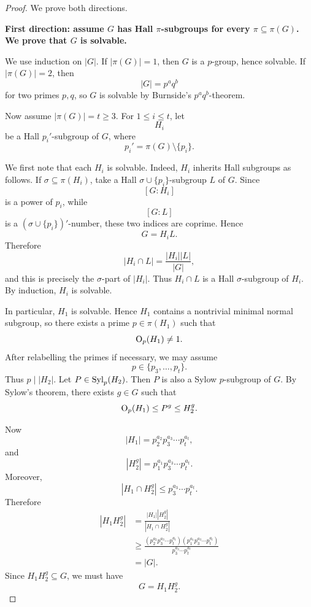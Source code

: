 \begin{proof}
We prove both directions.

\medskip

\noindent
\textbf{First direction: assume \(G\) has Hall \(\pi\)-subgroups for every
\(\pi\subseteq \pi(G)\). We prove that \(G\) is solvable.}

We use induction on \(|G|\). If \(|\pi(G)|=1\), then \(G\) is a \(p\)-group, hence
solvable. If \(|\pi(G)|=2\), then
\[
    |G|=p^a q^b
\]
for two primes \(p,q\), so \(G\) is solvable by Burnside's \(p^a q^b\)-theorem.

Now assume \(|\pi(G)|=t\geq 3\). For \(1\leq i\leq t\), let
\[
    H_i
\]
be a Hall \(p_i'\)-subgroup of \(G\), where
\[
    p_i'=\pi(G)\setminus \{p_i\}.
\]

We first note that each \(H_i\) is solvable. Indeed, \(H_i\) inherits Hall
subgroups as follows. If \(\sigma\subseteq \pi(H_i)\), take a Hall
\(\sigma\cup\{p_i\}\)-subgroup \(L\) of \(G\). Since
\[
    [G:H_i]
\]
is a power of \(p_i\), while
\[
    [G:L]
\]
is a \((\sigma\cup\{p_i\})'\)-number, these two indices are coprime. Hence
\[
    G=H_iL.
\]
Therefore
\[
    |H_i\cap L|
    =
    \frac{|H_i||L|}{|G|},
\]
and this is precisely the \(\sigma\)-part of \(|H_i|\). Thus \(H_i\cap L\) is a
Hall \(\sigma\)-subgroup of \(H_i\). By induction, \(H_i\) is solvable.

In particular, \(H_1\) is solvable. Hence \(H_1\) contains a nontrivial minimal
normal subgroup, so there exists a prime \(p\in \pi(H_1)\) such that
\[
    \mathrm{O}_{p}(H_1)\neq 1.
\]
After relabelling the primes if necessary, we may assume
\[
    p\in \{p_3,\ldots,p_t\}.
\]
Thus \(p\mid |H_2|\). Let \(P\in \operatorname{Syl}_p(H_2)\). Then \(P\) is also a Sylow
\(p\)-subgroup of \(G\). By Sylow's theorem, there exists \(g\in G\) such that
\[
    \mathrm{O}_{p}(H_1)\leq P^g\leq H_2^g.
\]

Now
\[
    |H_1|
    =
    p_2^{a_2}p_3^{a_3}\cdots p_t^{a_t},
\]
and
\[
    |H_2^g|
    =
    p_1^{a_1}p_3^{a_3}\cdots p_t^{a_t}.
\]
Moreover,
\[
    |H_1\cap H_2^g|
    \leq
    p_3^{a_3}\cdots p_t^{a_t}.
\]
Therefore
\[
\begin{aligned}
    |H_1H_2^g|
    &=
    \frac{|H_1||H_2^g|}{|H_1\cap H_2^g|}  \\
    &\geq
    \frac{
        (p_2^{a_2}p_3^{a_3}\cdots p_t^{a_t})
        (p_1^{a_1}p_3^{a_3}\cdots p_t^{a_t})
    }{
        p_3^{a_3}\cdots p_t^{a_t}
    }  \\
    &=
    |G|.
\end{aligned}
\]
Since \(H_1H_2^g\subseteq G\), we must have
\[
    G=H_1H_2^g.
\]


\end{proof}

